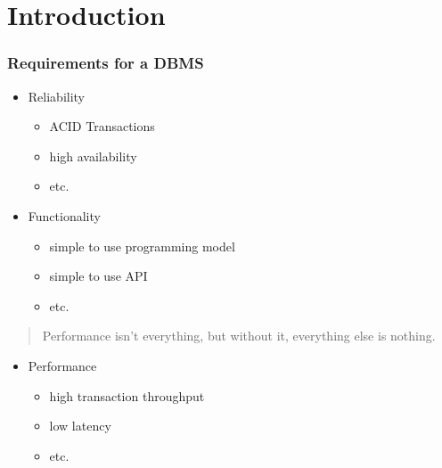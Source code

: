 \section[Introduction]{Introduction} \label{sec_intro}

\begin{frame}
	\sectionpage
\end{frame}

\begin{frame}
	
    \frametitle{Requirements for a DBMS}
    
    \begin{itemize}
    	\item Reliability
              \begin{itemize}
                  \item ACID Transactions
                  \item high availability
                  \item etc.
              \end{itemize}
        \item Functionality
              \begin{itemize}
                  \item simple to use programming model
                  \item simple to use API
                  \item etc.
              \end{itemize}
    \end{itemize}
    
    \begin{quote}
       	\small Performance isn't everything, but without it, everything else is nothing.
    \end{quote}
    
    \begin{itemize}
    	\item Performance
        	  \begin{itemize}
        	          \item high transaction throughput
                  \item low latency
                  \item etc.
        	  \end{itemize}
    \end{itemize}
    
\end{frame}

